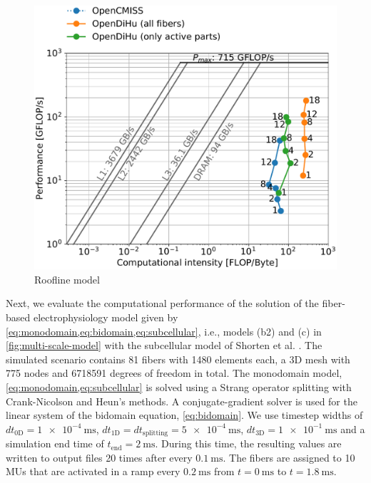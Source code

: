 \begin{figure}[H]
  \centering%
  \includegraphics[width=\textwidth]{images/results/studies/0_roofline.pdf}%
  \caption{Roofline model}%
  \label{fig:roofline}%
\end{figure}%


Next, we evaluate the computational performance of the solution of the fiber-based electrophysiology model given by \cref{eq:monodomain,eq:bidomain,eq:subcellular}, i.e., models (b2) and (c) in \cref{fig:multi-scale-model} with the subcellular model of Shorten et al. \cite{Shorten2007}.
The simulated scenario contains 81 fibers with \num{1480} elements each, a 3D mesh with \num{775} nodes and \num{6718591} degrees of freedom in total. The monodomain model, \cref{eq:monodomain,eq:subcellular} is solved using a Strang operator splitting with Crank-Nicolson and Heun's methods. A conjugate-gradient solver is used for the linear system of the bidomain equation, \cref{eq:bidomain}.
We use timestep widths of $dt_\text{0D}=\SI{1e-4}{\milli\second}$, $dt_\text{1D}=dt_\text{splitting}=\SI{5e-4}{\milli\second}$, $dt_\text{3D}=\SI{1e-1}{\milli\second}$ and a simulation end time of $t_\text{end}=\SI{2}{\milli\second}$. During this time, the resulting values are written to output files 20 times after every $\SI{0.1}{\milli\second}$. The fibers are assigned to 10 MUs that are activated in a ramp every $\SI{0.2}{\milli\second}$ from $t=\SI{0}{\milli\second}$ to $t=\SI{1.8}{\milli\second}$.

